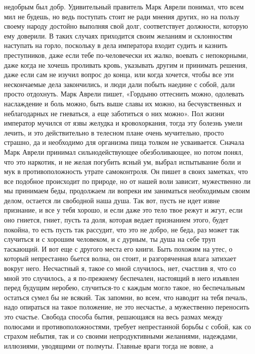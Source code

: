 недобрым был добр. Удивительный правитель Марк Аврели понимал, что всем мил не
будешь, но ведь поступать стоит не ради мнения других, но на пользу своему
народу достойно выполняя свой долг, соответствует должности, которую ему
доверили. В таких случаях приходится своим желаниям и склонностям наступать на
горло, поскольку в дела императора входит судить и казнить преступников, даже
если тебе по-человечески их жалко, воевать с непокорными, даже когда не хочешь
проливать кровь, указывать другим и принимать решения, даже если сам не изучил
вопрос до конца, или когда хочется, чтобы все эти нескончаемые дела закончились,
и люди дали побыть наедине с собой, дали просто отдохнуть. Марк Аврели пишет,
«Гордыню оттеснить можно, одолевать наслаждение и боль можно, быть выше славы их
можно, на бесчувственных и неблагодарных не гневаться, а еще заботиться о них
можно». Пол жизни император мучился от язвы желудка и кровохоркания, тогда эту
болезнь умели лечить, и это действительно в телесном плане очень мучительно,
просто страшно, да и необходимо для организма пища толком не усваивается.
Сначала Марк Аврели принимал сильнодействующее обезболивающее, но потом понял,
что это наркотик, и не желая погубить ясный ум, выбрал испытывание боли и мук в
противоположность утрате самоконтроля. Он пишет в своих заметках, что все
подобное происходит по природе, но от нашей воли зависит, мужественно ли мы
принимаем беды, продолжаем ли вопреки им заниматься необходимым своим делом,
остается ли свободной наша душа. Так вот, пусть не идет извне признание, и все у
тебя хорошо, и если даже это тело твое режут и жгут, если оно гниется, гниет,
пусть та доля, которая ведает признанием этого, будет покойна, то есть пусть так
рассудит, что это не добро, не беда, раз может так случиться и с хорошим
человеком, и с дурным, ты душа на себе труп таскающий. И вот еще с другого места
его книги. Быть похожим на утес, о который непрестанно бьется волна, он стоит, и
разгоряченная влага затихает вокруг него. Несчастный я, такое со мной случилось,
нет, счастлив я, что со мной это случилось, а я по-прежнему беспечален,
настоящий в него изъявлен перед будущим неробею, случиться-то с каждым могло
такое, но беспечальным остаться сумел бы не всякий. Так запомни, во всем, что
наводит на тебя печаль, надо опираться на такое положение, не это несчастье, а
мужественно переносить это счастье. Свобода способа бытия, решающаяся на весь
размах между полюсами и противоположностями, требует непрестанной борьбы с
собой, как со страхом небытия, так и со своими непродуктивными желаниями,
надеждами, иллюзиями, уводящими от полмуты. Главные враги тогда не вовне, а
